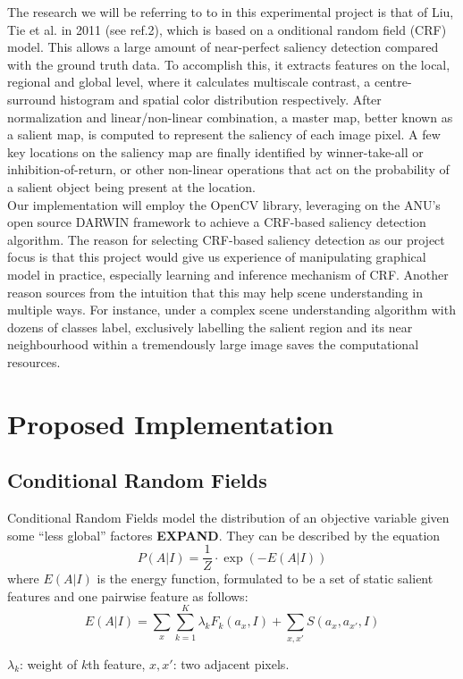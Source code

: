 \documentclass[12pt,a4paper]{article}
\newcommand{\BOLDL}[1]{\textbf{\large #1}}
\newcommand{\htab}{\hspace*{0.63cm}}
\newenvironment{Figure}
  {\par\medskip\noindent\minipage{\linewidth}}
  {\endminipage\par\medskip}
\begin{document}
\begin{multicols}{2}
\begin{Figure}
\end{Figure}
The research we will be referring to to in this experimental project is that of Liu, Tie et al. in 2011 (see ref.2), which is based on a onditional random field (CRF) model.  This allows a large amount of near-perfect saliency detection compared with the ground truth data. To accomplish this, it extracts features on the local, regional and global level, where it calculates multiscale contrast, a centre-surround histogram and spatial color distribution respectively. After normalization and linear/non-linear combination, a master map, better known as a salient map, is computed to represent the saliency of each image pixel. A few key locations on the saliency map are finally identified by winner-take-all or inhibition-of-return, or other non-linear operations that act on the probability of a salient object being present at the location.\\
\htab Our implementation will employ the  OpenCV library, leveraging on the ANU's open source DARWIN framework to achieve a CRF-based saliency detection algorithm. The reason for selecting CRF-based saliency detection as our project focus is that this project would give us experience of manipulating graphical model in practice, especially learning and inference mechanism of CRF. Another reason sources from the intuition that this may help scene understanding in multiple ways. For instance, under a complex scene understanding algorithm with dozens of classes label, exclusively labelling the salient region and its near neighbourhood within a tremendously large image saves the computational resources. 
\section{Proposed Implementation}
\subsection{Conditional Random Fields}
Conditional Random Fields model the distribution of an objective variable given some ``less global'' factores \BOLDL{EXPAND}.  They can be described by the equation
    $$ P(A|I) = \frac{1}{Z} \cdot\exp(-E(A|I)) $$
where $E(A|I)$ is the energy function, formulated to be a set of static salient features and one pairwise feature as follows:
    $$ E(A|I) = \sum_{x} \sum_{k=1}^{K} \lambda_{k} F_{k}(a_{x},I)  
        + \sum_{x,x'} S(a_{x},a_{x'},I)  $$ \vspace{-0.4cm}
\begin{center} \footnotesize $\lambda_{k}$: weight of $k$th feature, $x,x'$: two adjacent pixels. \end{center} 
%

\end{multicols}
\end{document}
